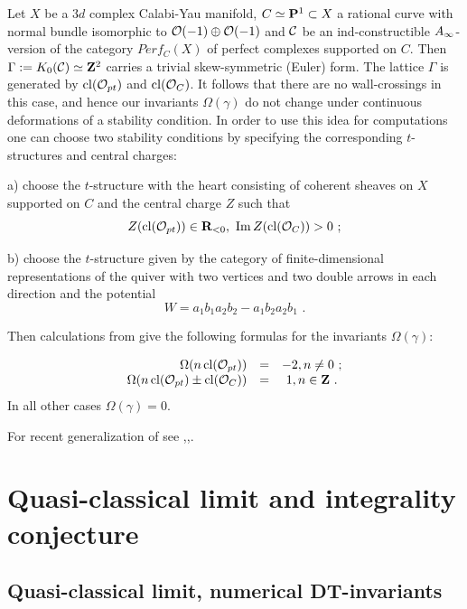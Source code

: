 \documentclass[12pt]{article}
\begin{document}
\begin{rmk} Let $X$ be a $3d$ complex Calabi-Yau manifold, $C\simeq {\bf P}^1\subset X$ a rational curve with normal bundle isomorphic to ${\cal O}(-1)\oplus {\cal O}(-1)$ and ${\mathcal C}$ be an ind-constructible $A_{\infty}$-version of the category $Perf_C(X)$ of perfect complexes supported on $C$. Then $\Gamma:=K_0({\mathcal C})\simeq {\bf Z}^2$ carries a trivial skew-symmetric (Euler) form. The lattice $\Gamma$ is generated by $\operatorname{cl}({\cal O}_{pt})$ and $\operatorname{cl}({\cal O}_{C})$.
It follows that there are no wall-crossings in this case, and hence our invariants $\Omega(\gamma)$ do not change under continuous deformations of a stability condition. In order to use this idea for computations one can choose two stability conditions by specifying the corresponding $t$-structures and central charges:

a) choose the $t$-structure with the heart consisting of coherent sheaves on $X$ supported on $C$ and the central charge $Z$ such that $$Z(\operatorname{cl}({\cal O}_{pt}))\in {\bf R}_{<0},\,\, \operatorname{Im} Z(\operatorname{cl}({\cal O}_{C}))>0\,\,;$$

b) choose the $t$-structure given by the category of finite-dimensional representations of the quiver with two vertices and two double arrows in each direction and the potential $$W=a_1b_1a_2b_2-a_1b_2a_2b_1\,\,.$$

Then calculations from \cite{Sz} give the following formulas for the invariants $\Omega(\gamma)$:

$$\begin{array}{rcc}\Omega(n\operatorname{cl}({\cal O}_{pt}))&=&-2, n\ne 0\,\,;\\
\Omega(n\operatorname{cl}({\cal O}_{pt})\pm \operatorname{cl}({\cal O}_{C}))&=&1, n\in {\bf Z}\,\,.
\end{array}$$
In all other cases $\Omega(\gamma)=0$.

For recent generalization of \cite{Sz} see \cite{MoRe2},\cite{NagNak},\cite{Nag}.


\end{rmk}











\section{Quasi-classical limit and integrality conjecture}

\subsection{Quasi-classical limit, numerical DT-invariants}
\end{document}
